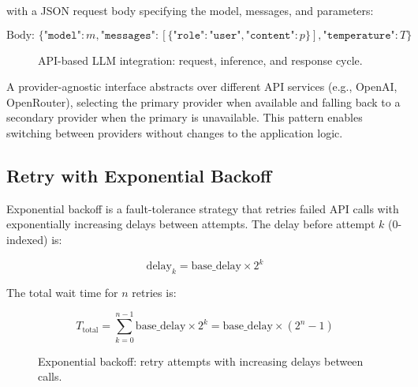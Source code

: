 \documentclass[10pt,a4paper]{article}
\begin{document}
with a JSON request body specifying the model, messages, and parameters:

\begin{equation}
\text{Body: } \{\texttt{"model"}: m, \texttt{"messages"}: [\{\texttt{"role"}: \texttt{"user"}, \texttt{"content"}: p\}], \texttt{"temperature"}: T\}
\label{eq:api-body}
\end{equation}

\begin{figure}[H]
    \centering
    \caption{API-based LLM integration: request, inference, and response cycle.}
    \label{fig:api-integration-flow}
\end{figure}

A provider-agnostic interface abstracts over different API services (e.g., OpenAI, OpenRouter), selecting the primary provider when available and falling back to a secondary provider when the primary is unavailable. This pattern enables switching between providers without changes to the application logic.

\subsection{Retry with Exponential Backoff}
\label{sec:exponential-backoff}

Exponential backoff is a fault-tolerance strategy that retries failed API calls with exponentially increasing delays between attempts. The delay before attempt $k$ (0-indexed) is:

\begin{equation}
\text{delay}_k = \text{base\_delay} \times 2^k
\label{eq:backoff-delay}
\end{equation}

The total wait time for $n$ retries is:

\begin{equation}
T_{\text{total}} = \sum_{k=0}^{n-1} \text{base\_delay} \times 2^k = \text{base\_delay} \times (2^n - 1)
\label{eq:backoff-total}
\end{equation}

\begin{figure}[H]
    \centering
    \caption{Exponential backoff: retry attempts with increasing delays between calls.}
    \label{fig:exponential-backoff}
\end{figure}
\end{document}
